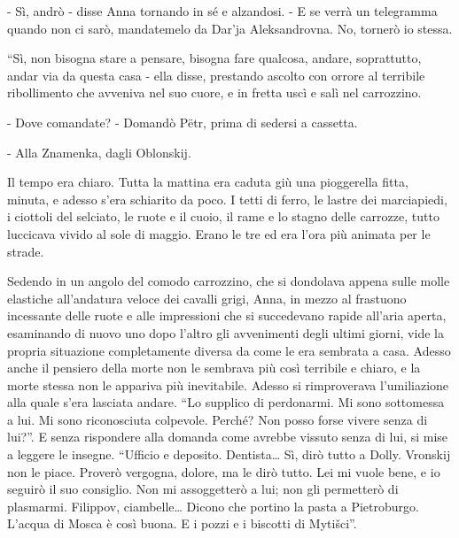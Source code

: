 - Sì, andrò - disse Anna tornando in sé e alzandosi. - E se verrà un telegramma quando non ci sarò, mandatemelo da Dar'ja Aleksandrovna. No, tornerò io stessa. 

``Sì, non bisogna stare a pensare, bisogna fare qualcosa, andare, soprattutto, andar via da questa casa - ella disse, prestando ascolto con orrore al terribile ribollimento che avveniva nel suo cuore, e in fretta uscì e salì nel carrozzino. 

- Dove comandate? - Domandò Pëtr, prima di sedersi a cassetta. 

- Alla Znamenka, dagli Oblonskij. 

\label{xxviii-5} 

Il tempo era chiaro. Tutta la mattina era caduta giù una pioggerella fitta, minuta, e adesso s'era schiarito da poco. I tetti di ferro, le lastre dei marciapiedi, i ciottoli del selciato, le ruote e il cuoio, il rame e lo stagno delle carrozze, tutto luccicava vivido al sole di maggio. Erano le tre ed era l'ora più animata per le strade. 

Sedendo in un angolo del comodo carrozzino, che si dondolava appena sulle molle elastiche all'andatura veloce dei cavalli grigi, Anna, in mezzo al frastuono incessante delle ruote e alle impressioni che si succedevano rapide all'aria aperta, esaminando di nuovo uno dopo l'altro gli avvenimenti degli ultimi giorni, vide la propria situazione completamente diversa da come le era sembrata a casa. Adesso anche il pensiero della morte non le sembrava più così terribile e chiaro, e la morte stessa non le appariva più inevitabile. Adesso si rimproverava l'umiliazione alla quale s'era lasciata andare. ``Lo supplico di perdonarmi. Mi sono sottomessa a lui. Mi sono riconosciuta colpevole. Perché? Non posso forse vivere senza di lui?''. E senza rispondere alla domanda come avrebbe vissuto senza di lui, si mise a leggere le insegne. ``Ufficio e deposito. Dentista\ldots{} Sì, dirò tutto a Dolly. Vronskij non le piace. Proverò vergogna, dolore, ma le dirò tutto. Lei mi vuole bene, e io seguirò il suo consiglio. Non mi assoggetterò a lui; non gli permetterò di plasmarmi. Filippov, ciambelle\ldots{} Dicono che portino la pasta a Pietroburgo. L'acqua di Mosca è così buona. E i pozzi e i biscotti di Mytišci''. 

